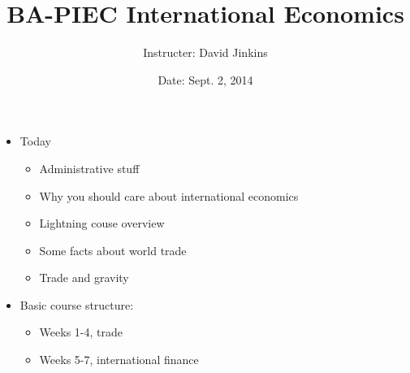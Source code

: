 \documentclass[ignorenonframetext,]{beamer}
\title{BA-PIEC International Economics}
\author{Instructer: David Jinkins}
\date{Date: Sept. 2, 2014}
\begin{document}
\frame{\titlepage}

\begin{frame}

\begin{itemize}
\itemsep1pt\parskip0pt
\item
  Today

  \begin{itemize}
  \itemsep1pt\parskip0pt
  \item
        Administrative stuff
  \item
        Why you should care about international economics
  \item
        Lightning couse overview
  \item
        Some facts about world trade
  \item
        Trade and gravity
  \end{itemize}
\end{itemize}

\end{frame}

\begin{frame}

\begin{itemize}
\itemsep1pt\parskip0pt
\item
  Basic course structure:

  \begin{itemize}
  \itemsep1pt\parskip0pt
  \item
    Weeks 1-4, trade
  \item
    Weeks 5-7, international finance
  \end{itemize}
\end{itemize}

\end{frame}
\end{document}
